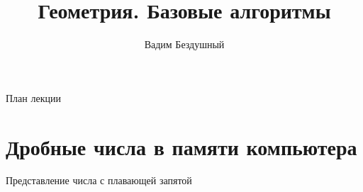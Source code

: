 \documentclass{beamer}
\title{Геометрия. Базовые алгоритмы}
\author{Вадим Бездушный}
\date{Факультатив Алгоритмики, 2017\par Подготовка к обласной олимпиаде, 2018}
\begin{document}
\begin{frame}
  \titlepage
\end{frame}

\begin{frame}{План лекции}
  \tableofcontents
\end{frame}

\section{Дробные числа в памяти компьютера}

  
\begin{frame}{Представление числа с плавающей запятой}
\end{frame}
\end{document}
